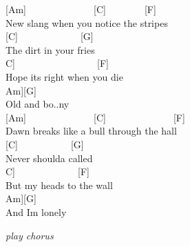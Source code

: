 \documentclass[
  letterpaper,
  a5paper]{memoir}
\begin{document}
{[}Am{]}~~~~~~~~~~~~~~{[}C{]}~~~~~~~~{[}F{]}\\
New slang when you notice the stripes\\
{[}C{]}~~~~~~~~~~~~~{[}G{]}\\
The dirt in your fries\\
\hspace*{0.333em}\hspace*{0.333em}\hspace*{0.333em}\hspace*{0.333em}{[}C{]}~~~~~~~~~~~~~~~~~{[}F{]}\\
Hope it\textquotesingle s right when you die\\
\hspace*{0.333em}\hspace*{0.333em}\hspace*{0.333em}\hspace*{0.333em}\hspace*{0.333em}\hspace*{0.333em}\hspace*{0.333em}{[}Am{]}{[}G{]}\\
Old and bo..ny\\
{[}Am{]}~~~~~~~~~~~~~~{[}C{]}~~~~~~~~~~~~~~{[}F{]}\\
Dawn breaks like a bull through the hall\\
{[}C{]}~~~~~~~~~~~{[}G{]}\\
Never should\textquotesingle a called\\
\hspace*{0.333em}\hspace*{0.333em}\hspace*{0.333em}{[}C{]}~~~~~~~~~~~~~{[}F{]}\\
But my heads to the wall\\
\hspace*{0.333em}\hspace*{0.333em}\hspace*{0.333em}\hspace*{0.333em}\hspace*{0.333em}\hspace*{0.333em}\hspace*{0.333em}{[}Am{]}{[}G{]}\\
And I\textquotesingle m lonely

\emph{play chorus}
\end{document}
